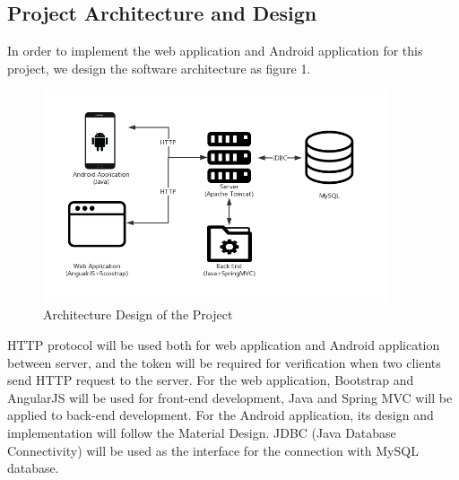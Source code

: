 \documentclass[12pt,a4]{article}
\begin{document}
\subsection{Project Architecture and Design}\label{3.2}
In order to implement the web application and Android application for this project, we design the software architecture as figure 1. 
\begin{figure}[h]%
		\centering  %
		\includegraphics[width=4in]{figure/1}  	%
		\caption{Architecture Design of the Project}   %
		\end{figure}
HTTP protocol will be used both for web application and Android application between server, and the token will be required for verification when two clients send HTTP request to the server. For the web application, Bootstrap and AngularJS will be used for front-end development, Java and Spring MVC will be applied to back-end development. For the Android application, its design and implementation will follow the Material Design. JDBC (Java Database Connectivity) will be used as the interface for the connection with MySQL database.
\end{document}
